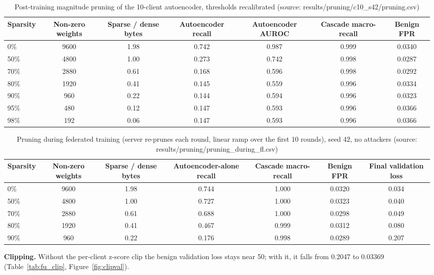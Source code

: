\begin{table}[H]
\centering
\scriptsize
\setlength{\tabcolsep}{3pt}
\renewcommand{\arraystretch}{1.15}
\begin{tabular}{|l|c|c|c|c|c|c|}
\hline
\textbf{Sparsity} & \textbf{Non-zero weights} & \textbf{Sparse / dense bytes} & \textbf{Autoencoder recall} & \textbf{Autoencoder AUROC} & \textbf{Cascade macro-recall} & \textbf{Benign FPR} \\ \hline
0\% & 9600 & 1.98 & 0.742 & 0.987 & 0.999 & 0.0340 \\ \hline
50\% & 4800 & 1.00 & 0.273 & 0.742 & 0.998 & 0.0287 \\ \hline
70\% & 2880 & 0.61 & 0.168 & 0.596 & 0.998 & 0.0292 \\ \hline
80\% & 1920 & 0.41 & 0.145 & 0.559 & 0.996 & 0.0334 \\ \hline
90\% & 960 & 0.22 & 0.144 & 0.594 & 0.996 & 0.0323 \\ \hline
95\% & 480 & 0.12 & 0.147 & 0.593 & 0.996 & 0.0366 \\ \hline
98\% & 192 & 0.06 & 0.147 & 0.593 & 0.996 & 0.0366 \\ \hline
\end{tabular}
\caption{Post-training magnitude pruning of the 10-client autoencoder, thresholds recalibrated (source: results/pruning/c10\_s42/pruning.csv)}
\label{tab:fu_prune_post}
\end{table}
\begin{table}[H]
\centering
\scriptsize
\setlength{\tabcolsep}{3pt}
\renewcommand{\arraystretch}{1.15}
\begin{tabular}{|l|c|c|c|c|c|c|}
\hline
\textbf{Sparsity} & \textbf{Non-zero weights} & \textbf{Sparse / dense bytes} & \textbf{Autoencoder-alone recall} & \textbf{Cascade macro-recall} & \textbf{Benign FPR} & \textbf{Final validation loss} \\ \hline
0\% & 9600 & 1.98 & 0.744 & 1.000 & 0.0320 & 0.034 \\ \hline
50\% & 4800 & 1.00 & 0.727 & 1.000 & 0.0323 & 0.040 \\ \hline
70\% & 2880 & 0.61 & 0.688 & 1.000 & 0.0298 & 0.049 \\ \hline
80\% & 1920 & 0.41 & 0.467 & 0.999 & 0.0312 & 0.080 \\ \hline
90\% & 960 & 0.22 & 0.176 & 0.998 & 0.0289 & 0.207 \\ \hline
\end{tabular}
\caption{Pruning during federated training (server re-prunes each round, linear ramp over the first 10 rounds), seed 42, no attackers (source: results/pruning/pruning\_during\_fl.csv)}
\label{tab:fu_prune_fl}
\end{table}
\textbf{Clipping.} Without the per-client z-score clip the benign validation loss stays near 50; with it, it falls from 0.2047 to 0.03369 (Table~\ref{tab:fu_clip}, Figure~\ref{fig:clipval}).

